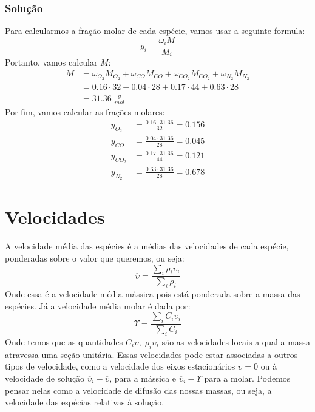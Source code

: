 \subsubsection{Solução}
Para calcularmos a fração molar de cada espécie, vamos usar a seguinte formula:
\begin{equation}
    y_{i} = \frac{\omega _{i} M}{M_{i} }
\end{equation}
Portanto, vamos calcular \(M\):
\begin{align}
    M &=  \omega _{O_{2}} M_{O_{2}} + \omega _{CO} M_{CO} + \omega _{CO_{2}} M_{CO_{2}} + \omega _{N_{2}} M_{N_{2}} \\
    &=  0.16 \cdot 32 + 0.04 \cdot 28 + 0.17 \cdot 44 + 0.63 \cdot 28 \\
    &=  31.36 \; \frac{g}{mol}
\end{align}
Por fim, vamos calcular as frações molares:
\begin{align}
    y_{O_{2}} &= \frac{0.16 \cdot 31.36}{32} = 0.156 \\
    y_{CO} &= \frac{0.04 \cdot 31.36}{28} = 0.045 \\
    y_{CO_{2}} &= \frac{0.17 \cdot 31.36}{44} = 0.121 \\
    y_{N_{2}} &= \frac{0.63 \cdot 31.36}{28} = 0.678
\end{align}
\section{Velocidades}
A velocidade média das espécies é a médias das velocidades de cada espécie, ponderadas sobre o valor
que queremos, ou seja:
\begin{equation}\label{eq:velocidade_media_massica}
    \overline{\upsilon } = \frac{\sum_{i} \rho _{i} \overline{\upsilon }_{i} }{\sum_{i} \rho _{i} }
\end{equation}
Onde essa é a velocidade média mássica pois está ponderada sobre a massa das espécies. Já a
velocidade média molar é dada por:
\begin{equation}\label{eq:velocidade_media_molar}
    \overline{\Upsilon } = \frac{\sum_{i} C_i \overline{\upsilon }_{i} }{\sum_{i} C_i }
\end{equation}
Onde temos que as quantidades \(C_{i} \overline{\upsilon }, \; \rho _{i} \overline{\upsilon } _{i}
\) são as velocidades locais a qual a massa atravessa uma seção unitária. Essas velocidades pode
estar associadas a outros tipos de velocidade, como a velocidade dos eixos estacionários
\(\overline{\upsilon } = 0\) ou à velocidade de solução \(\overline{\upsilon } _{i} -
\overline{\upsilon } \), para a mássica e \(\overline{\upsilon } _{i} - \overline{\Upsilon } \) para
a molar. Podemos pensar nelas como a velocidade de difusão das nossas massas, ou seja, a velocidade
das espécias relativas à solução.
